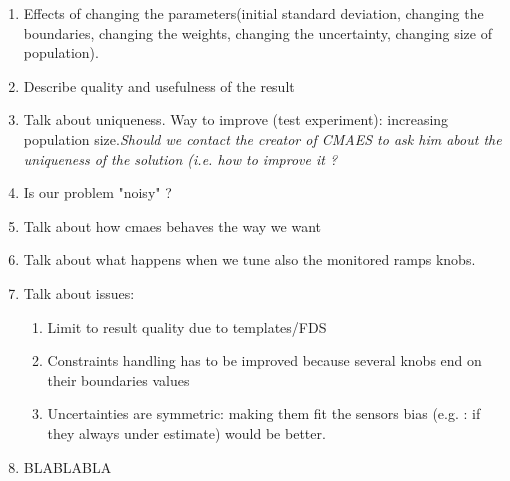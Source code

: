 





\begin{enumerate}
	\item Effects of changing the parameters(initial standard deviation, changing the boundaries, changing the weights, changing the uncertainty, changing size of population).
	\item Describe quality and usefulness of the result
	\item Talk about uniqueness. Way to improve (test experiment): increasing population size.\emph{Should we contact the creator of CMAES to ask him about the uniqueness of the solution (i.e. how to improve it ?}
	\item Is our problem "noisy" ?
	\item Talk about how cmaes behaves the way we want
	\item Talk about what happens when we tune also the monitored ramps knobs.	
	\item Talk about issues:
\begin{enumerate}
	\item Limit to result quality due to templates/FDS
	\item Constraints handling has to be improved because several knobs end on their boundaries values\
	\item Uncertainties are symmetric: making them fit the sensors bias (e.g. : if they always under estimate) would be better.
\end{enumerate}
	\item BLABLABLA
\end{enumerate} 
